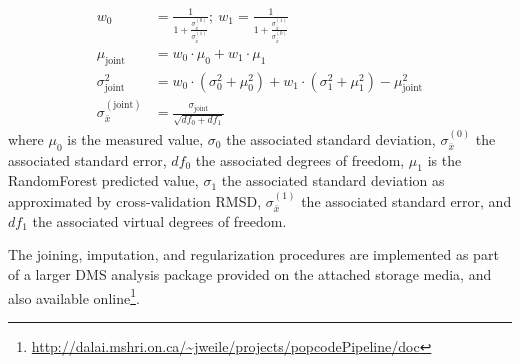 \begin{align*}
w_0 &= \frac{1}{1+\frac{\sigma_{\bar x}^{(0)}}{\sigma_{\bar x}^{(1)}}}; ~ w_1 = \frac{1}{1+\frac{\sigma_{\bar x}^{(1)}}{\sigma_{\bar x}^{(0)}}}\\
\mu_\text{joint} &= w_0 \cdot \mu_0 + w_1 \cdot \mu_1\\
\sigma_\text{joint}^2 &= w_0 \cdot (\sigma_0^2 + \mu_0^2) + w_1 \cdot (\sigma_1^2 + \mu_1^2) - \mu_\text{joint}^2\\
\sigma_{\bar x}^{(\text{joint})} &= \frac{\sigma_\text{joint}}{\sqrt{df_0 + df_1}}
\end{align*}
where $\mu_0$ is the measured value, $\sigma_0$ the associated standard deviation, $\sigma_{\bar x}^{(0)}$ the associated standard error, $df_0$ the associated degrees of freedom, $\mu_1$ is the RandomForest predicted value, $\sigma_1$ the associated standard deviation as approximated by cross-validation RMSD, $\sigma_{\bar x}^{(1)}$ the associated standard error, and $df_1$ the associated virtual degrees of freedom.

The joining, imputation, and regularization procedures are implemented as part of a larger DMS analysis package provided on the attached storage media, and also available online\footnote{\url{http://dalai.mshri.on.ca/~jweile/projects/popcodePipeline/doc}}.

